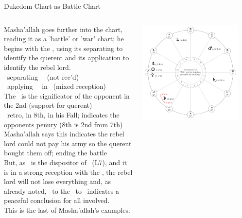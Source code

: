 \begin{frame}[t]{Dukedom Chart as Battle Chart}
\footnotesize
\begin{columns}[T, onlytextwidth]
Masha'allah goes further into the chart, reading it as a 'battle' or 'war' chart; he begins with the \Moon, using its separating to identify the querent and its application to identify the rebel lord. \\
\vspace{0.25cm}
\Moon\ separating \Trine\ \Jupiter\ (not rec'd) \\
\Moon\ applying \Opposition\ \Mars\ in \Cancer\ (mixed reception) \\
\vspace{0.2cm}
The \Moon\ is the significator of the opponent  in the 2nd (support for querent) \\
\Mars\ retro, in 8th, in his Fall; indicates the opponents penury (8th is 2nd from 7th) \\
\vspace{0.2cm}
Masha'allah says this indicates the rebel lord could not pay his army
so the querent bought them off; ending the battle \\
\vspace{0.25cm}
But, as \Mars\ is the dispositor of \Mercury\ (L7), and it is in a strong reception with the \Moon, the rebel lord will not lose everything and, as already noted, \Mercury\ to the \Sextile\ to \Jupiter\ indicates a peaceful conclusion for all involved.\\
\vspace{0.2cm}
This is the last of Masha'allah's examples.
\begin{center}
{\includegraphics[width=0.9\textwidth]{charts/52a-chart-dukedom}} \\
\end{center}
\end{columns}
\end{frame}